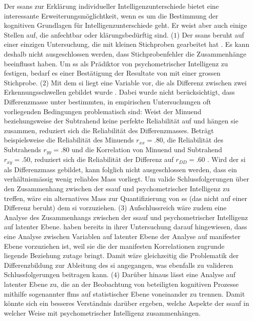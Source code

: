 \documentclass[11pt, twoside, a4paper]{book}		%
\begin{document}
Der \gls{ssans} zur Erklärung individueller Intelligenzunterschiede \citep{Melnick2013} bietet eine interessante Erweiterungsmöglichtkeit, wenn es um die Bestimmung der kognitiven Grundlagen für Intelligenzunterschiede geht. Er weist aber auch einige Stellen auf, die anfechtbar oder klärungsbedürftig sind.
($1$) Der \gls{ssans} beruht auf einer einzigen Untersuchung, die mit kleinen Stichproben gearbeitet hat \citep[Studie 1: $N=12$ und Studie 2: $N=53$;][]{Melnick2013}. Es kann deshalb nicht ausgeschlossen werden, dass Stichprobenfehler die Zusammenhänge beeinflusst haben. Um \gls{ss} als Prädiktor von psychometrischer Intelligenz zu festigen, bedarf es einer Bestätigung der Resultate von \citet{Melnick2013} mit einer grossen Stichprobe.
($2$) Mit dem \gls{si} liegt eine Variable vor, die als Differenz zwischen zwei Erkennungsschwellen gebildet wurde \citep{Melnick2013, Tadin2006, Tadin2011}. Dabei wurde nicht berücksichtigt, dass Differenzmasse unter bestimmten, in empirischen Untersuchungen oft vorliegenden Bedingungen problematisch sind: Weist der Minuend  beziehungsweise der Subtrahend keine perfekte Reliabilität auf und hängen sie zusammen, reduziert sich die Reliabilität des Differenzmasses. Beträgt beispielsweise die Reliabilität des Minuends $r_{xx} = .80$, die Reliabilität des Subtrahends $r_{yy} = .80$ und die Korrelation von Minuend und Subtrahend $r_{xy} = .50$, reduziert sich die Reliabilität der Differenz auf $r_{DD} = .60$ \citep[][S. 145]{Murphy2005}. Wird der \gls{si} als Differenzmass gebildet, kann folglich nicht ausgeschlossen werden, dass ein verhältnismässig wenig reliables Mass vorliegt. Um valide Schlussfolgerungen über den Zusammenhang zwischen der \gls{ssauf} und psychometrischer Intelligenz zu treffen, wäre ein alternatives Mass zur Quantifizierung von \gls{ss} (das nicht auf einer Differenz beruht) dem \gls{si} vorzuziehen.
($3$) Aufschlussreich wäre zudem eine Analyse des Zusammenhangs zwischen der \gls{ssauf} und psychometrischer Intelligenz auf latenter Ebene. \citeauthor{Melnick2013} haben bereits in ihrer Untersuchung darauf hingewiesen, dass eine Analyse zwischen Variablen auf latenter Ebene der Analyse auf manifester Ebene vorzuziehen ist, weil sie die der manifesten Korrelationen zugrunde liegende Beziehung zutage bringt. Damit wäre gleichzeitig die Problematik der Differenzbildung zur Ableitung des \gls{si} angegangen, was ebenfalls zu valideren Schlussfolgerungen beitragen kann.
($4$) Darüber hinaus lässt eine Analyse auf latenter Ebene zu, die an der Beobachtung von \citeauthor{Melnick2013} beteiligten kognitiven Prozesse mithilfe sogenannter \glspl{flm} \citep[z. B.][]{Schweizer2006a, Schweizer2006b, Schweizer2007, Schweizer2008, Schweizer2009a} auf statistischer Ebene voneinander zu trennen. Damit könnte sich ein besseres Verständnis darüber ergeben, welche Aspekte der \gls{ssauf} in welcher Weise mit psychometrischer Intelligenz zusammenhängen.
\end{document}
